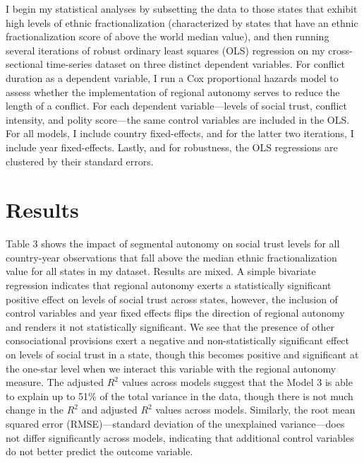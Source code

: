 \documentclass[12pt]{article}
\begin{document}
I begin my statistical analyses by subsetting the data to those states that exhibit high levels of ethnic fractionalization (characterized by states that have an ethnic fractionalization score of above the world median value), and then running several iterations of robust ordinary least squares (OLS) regression on my cross-sectional time-series dataset on three distinct dependent variables. For conflict duration as a dependent variable, I run a Cox proportional hazards model to assess whether the implementation of regional autonomy serves to reduce the length of a conflict. For each dependent variable---levels of social trust, conflict intensity, and polity score---the same control variables are included in the OLS. For all models, I include country fixed-effects, and for the latter two iterations, I include year fixed-effects. Lastly, and for robustness, the OLS regressions are clustered by their standard errors.  

\section{Results}
Table 3 shows the impact of segmental autonomy on social trust levels for all country-year observations that fall above the median ethnic fractionalization value for all states in my dataset. Results are mixed. A simple bivariate regression indicates that regional autonomy exerts a statistically significant positive effect on levels of social trust across states, however, the inclusion of control variables and year fixed effects flips the direction of regional autonomy and renders it not statistically significant. We see that the presence of other consociational provisions exert a negative and non-statistically significant effect on levels of social trust in a state, though this becomes positive and significant at the one-star level when we interact this variable with the regional autonomy measure. The adjusted $R^2$ values across models suggest that the Model 3 is able to explain up to 51\% of the total variance in the data, though there is not much change in the $R^2$ and adjusted $R^2$ values across models. Similarly, the root mean squared error (RMSE)---standard deviation of the unexplained variance---does not differ significantly across models, indicating that additional control variables do not better predict the outcome variable.  
\end{document}
